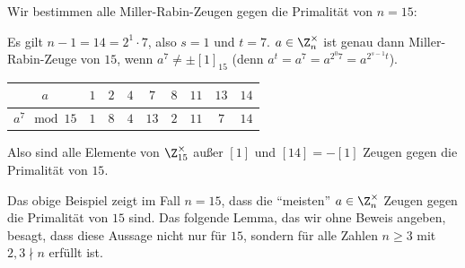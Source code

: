 \begin{example}
 Wir bestimmen alle Miller-Rabin-Zeugen gegen die Primalität von $n = 15$:
 
 Es gilt $n-1 = 14 = 2^1 \cdot 7$, also $s = 1$ und $t=7$. $a \in \Z_n^{\times}$ ist genau dann Miller-Rabin-Zeuge von $15$, wenn $a^7 ≠ \pm [1]_{15}$ (denn $a^t = a^7 = a^{2^0 7} = a^{2^{s-1}t}$).
 \begin{center}
 \begin{tabular}{|c|cccccccc|}
  \hline 
  $a$ & $1$ & $2$ & $4$ & $7$ & $8$ & $11$ & $13$ & $14$ \\
  \hline
  \hline
  $a^7 \mod 15$ & $1$ & $8$ & $4$ & $13$ & $2$ & $11$ & $7$ & $14$ \\
  \hline
 \end{tabular}
\end{center}
 Also sind alle Elemente von $\Z_{15}^{\times}$ außer $[1]$ und $[14] = -[1]$ Zeugen gegen die Primalität von $15$.
\end{example}

Das obige Beispiel zeigt im Fall $n = 15$, dass die \enquote{meisten} $a \in \Z_n^{\times}$ Zeugen gegen die Primalität von $15$ sind. Das folgende Lemma, das wir ohne Beweis angeben, besagt, dass diese Aussage nicht nur für $15$, sondern für alle Zahlen $n \geq 3$ mit $2, 3 \nmid n$ erfüllt ist. 


